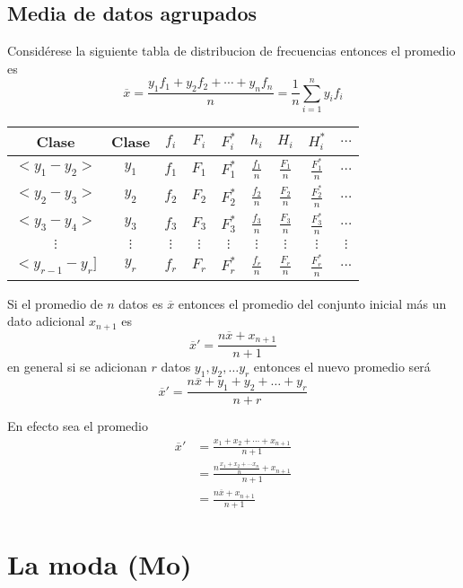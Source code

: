 \documentclass[10pt,]{krantz}
\theoremstyle{definition}
\theoremstyle{definition}
\theoremstyle{definition}
\theoremstyle{remark}
\let\BeginKnitrBlock\begin \let\EndKnitrBlock\end
\begin{document}
\hypertarget{media-de-datos-agrupados}{%
\subsection{Media de datos agrupados}\label{media-de-datos-agrupados}}

Considérese la siguiente tabla de distribucion de frecuencias entonces el promedio es \[\overline{x}=\frac{y_1f_1+y_2f_2+\cdots+y_nf_n}{n}=\frac{1}{n}\sum_{i=1}^ny_if_i\]

\begin{longtable}[]{@{}ccccccccc@{}}
\toprule
Clase & Clase & \(f_i\) & \(F_i\) & \(F_i^*\) & \(h_i\) & \(H_i\) & \(H_i^*\) & \(\ldots\)\tabularnewline
\midrule
\endhead
\(<y_1-y_2>\) & \(y_1\) & \(f_1\) & \(F_1\) & \(F_1^*\) & \(\frac{f_1}{n}\) & \(\frac{F_1}{n}\) & \(\frac{F_1^*}{n}\) & \(\ldots\)\tabularnewline
\(<y_2-y_3>\) & \(y_2\) & \(f_2\) & \(F_2\) & \(F_2^*\) & \(\frac{f_2}{n}\) & \(\frac{F_2}{n}\) & \(\frac{F_2^*}{n}\) & \(\ldots\)\tabularnewline
\(<y_3-y_4>\) & \(y_3\) & \(f_3\) & \(F_3\) & \(F_3^*\) & \(\frac{f_3}{n}\) & \(\frac{F_3}{n}\) & \(\frac{F_3^*}{n}\) & \(\ldots\)\tabularnewline
\(\vdots\) & \(\vdots\) & \(\vdots\) & \(\vdots\) & \(\vdots\) & \(\vdots\) & \(\vdots\) & \(\vdots\) & \(\vdots\)\tabularnewline
\(<y_{r-1}-y_r]\) & \(y_r\) & \(f_r\) & \(F_r\) & \(F_r^*\) & \(\frac{f_r}{n}\) & \(\frac{F_r}{n}\) & \(\frac{F_r^*}{n}\) & \(...\)\tabularnewline
\bottomrule
\end{longtable}

\BeginKnitrBlock{exercise}
\protect\hypertarget{exr:unnamed-chunk-3}{}{\label{exr:unnamed-chunk-3} }Si el promedio de \(n\) datos es \(\overline{x}\) entonces el promedio del conjunto inicial más un dato adicional \(x_{n+1}\) es \[\overline{x}'=\frac{n\overline{x}+x_{n+1}}{n+1}\] en general si se adicionan \(r\) datos \(y_1, y_2, \ldots y_r\) entonces el nuevo promedio será \[\overline{x}'=\frac{n\overline{x}+y_{1}+y_2+\ldots+y_r}{n+r}\]
\EndKnitrBlock{exercise}

\BeginKnitrBlock{solution}
\iffalse{} {Solución. } \fi{}En efecto sea el promedio
\begin{align*}
\overline{x}'&=\frac{x_1+x_2+\cdots+x_{n+1}}{n+1}\\
&=\frac{n\frac{x_1+x_2+\cdots x_n}{n}+x_{n+1}}{n+1}\\
&=\frac{n\overline{x}+x_{n+1}}{n+1}
\end{align*}
\EndKnitrBlock{solution}

\hypertarget{la-moda-mo}{%
\section{La moda (Mo)}\label{la-moda-mo}}
\end{document}
